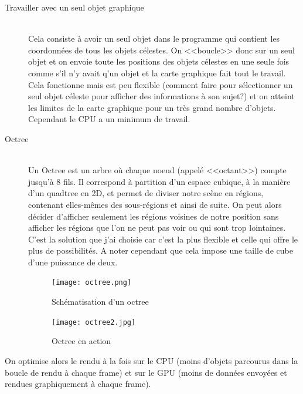 \documentclass[a4paper,french,12pt]{article}
\begin{document}
		  \begin{description}
		   \item [Travailler avec un seul objet graphique]~\\ Cela consiste à avoir un seul objet dans le programme qui 
		   contient les coordonnées de tous les objets célestes. On <<boucle>> donc sur un seul objet et on envoie toute
		   les positions des objets célestes en une seule fois comme s'il n'y avait q'un objet et la carte
		   graphique fait tout le travail. Cela fonctionne mais est peu flexible (comment faire pour sélectionner
		   un seul objet céleste pour afficher des informations à son sujet?) et on atteint les limites de la
		   carte graphique pour un très grand nombre d'objets. Cependant le CPU a un minimum de travail.
		   
		   \item [Octree]~\\ Un Octree est un arbre où chaque noeud (appelé <<octant>>) compte jusqu'à 8 fils. Il correspond à partition
		   d'un espace cubique, à la manière d'un quadtree en 2D, et permet de diviser notre scène en régions,
		   contenant elles-mêmes des sous-régions et ainsi de suite. On peut alors décider d'afficher seulement les
		   régions voisines de notre position sans afficher les régions que l'on ne peut pas voir ou qui sont
		   trop lointaines. C'est la solution que j'ai choisie car c'est la plus flexible et celle qui offre le
		   plus de possibilités. A noter cependant que cela impose une taille de cube d'une puissance de deux.
		   
		   \begin{figure}
			      \centering
				\texttt{[image: octree.png]}
			      \caption{Schématisation d'un octree}
			       
		    \end{figure} 
		    
		
			       
		\begin{figure} 
			\centering
				\texttt{[image: octree2.jpg]}
			      \caption{Octree en action}
		   
		\end{figure}
		   
		 \end{description}

		  
		 On optimise alors le rendu à la fois sur le CPU (moins d'objets parcourus dans la boucle
			       de rendu à chaque frame) et sur le GPU (moins de données envoyées et 
			       rendues graphiquement à chaque frame).  
		  		
\end{document}
